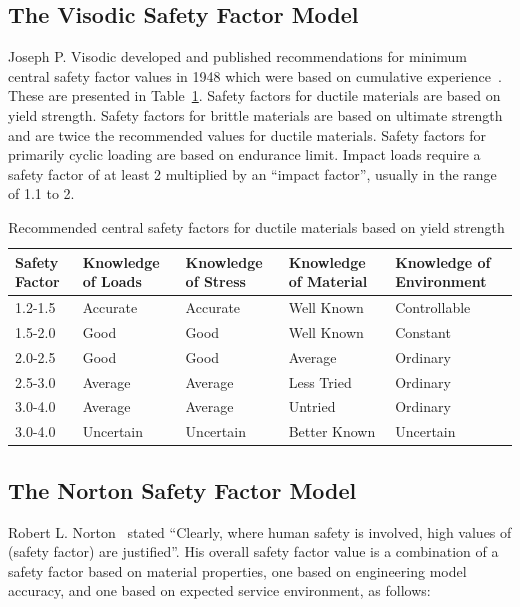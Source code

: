 \subsection{The Visodic Safety Factor Model}

Joseph P. Visodic developed and published recommendations for minimum central safety factor values in 1948 which were based on cumulative experience~\cite{joseph2001}\cite{juvinall1983}. These are presented in Table~\ref{tbl-visodic}. Safety factors for ductile materials are based on yield strength. Safety factors for brittle materials are based on ultimate strength and are twice the recommended values for ductile materials. Safety factors for primarily cyclic loading are based on endurance limit. Impact loads require a safety factor of at least 2 multiplied by an ``impact factor'', usually in the range of 1.1 to 2.

\begin{table}
    \footnotesize
    \centering
    \begin{tabular}{p{} p{} p{} p{} p{}}
      \toprule
        Safety Factor & Knowledge of Loads & Knowledge of Stress & Knowledge of Material & Knowledge of Environment \\
      \midrule
        1.2-1.5 & Accurate & Accurate & Well Known & Controllable \\
        1.5-2.0 & Good & Good & Well Known & Constant \\
        2.0-2.5 & Good & Good & Average & Ordinary \\
        2.5-3.0 & Average & Average & Less Tried & Ordinary \\
        3.0-4.0 & Average & Average & Untried & Ordinary \\
        3.0-4.0 & Uncertain & Uncertain & Better Known & Uncertain \\
      \bottomrule
    \end{tabular}
  \caption[Recommended central safety factors for ductile materials based on yield strength]{Recommended central safety factors for ductile materials based on yield strength~\citep{joseph2001}}
  \label{tbl-visodic}
\end{table}

\subsection{The Norton Safety Factor Model}

Robert L. Norton~\cite{robert2006} stated ``Clearly, where human safety is involved, high values of (safety factor) are justified''. His overall safety factor value is a combination of a safety factor based on material properties, one based on engineering model accuracy, and one based on expected service environment, as follows:

